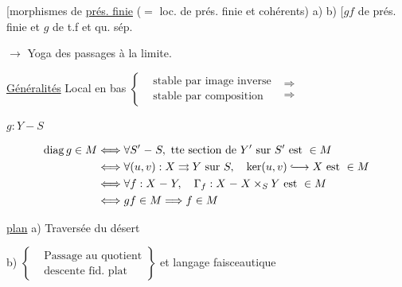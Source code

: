[morphismes de \uline{prés. finie} ($={}$ loc. de prés. finie et cohérents) \quad a) b) \quad [$gf$ de prés. finie et $g$ de t.f et qu. sép.


$\longrightarrow$ Yoga des passages à la limite.

\uline{Généralités} \quad Local en bas $\left\{\begin{aligned}&\text{stable par image inverse}\\&\text{stable par composition}\end{aligned}\right.$ $\substack{\Longrightarrow\\\Longrightarrow}$

$g:Y\mathrel{-}S$

\[
\begin{aligned}
\operatorname{diag}g\in M &\Longleftrightarrow \forall S'\mathrel{-}S,\ \text{tte section de }Y'\text{ sur }S'\text{ est }\in M\\
 &\Longleftrightarrow \forall (u,v):X\rightrightarrows Y\text{ sur }S,\quad\ker(u,v)\lhook\joinrel\longrightarrow X\text{ est }\in M\\
 &\Longleftrightarrow \forall f:X\mathrel{-}Y,\quad\Gamma_f:X\mathrel{-}X\times_S Y\text{ est }\in M\\
 &\Longleftrightarrow gf\in M\Longrightarrow f\in M
\end{aligned}
\]



\uline{plan} \quad a) Traversée du désert

b) $\left\{\begin{aligned}&\text{Passage au quotient}\\&\text{descente fid. plat}\end{aligned}\right\}$ et langage faisceautique


